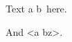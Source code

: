 \documentclass{article}
\newcommand\barx{a \undefinedC b}
\newcommand\outerx[1]{<\barx #1>}
\begin{document}
Text \barx\ here.

And \outerx{z}.
\end{document}
